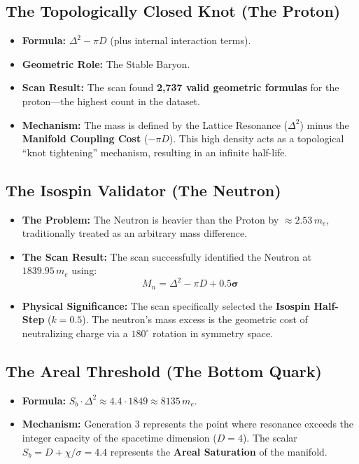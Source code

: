 \subsection*{The Topologically Closed Knot (The Proton)}
\begin{itemize}
    \item \textbf{Formula:} $\Delta^2 - \pi D$ (plus internal interaction terms).
    \item \textbf{Geometric Role:} The Stable Baryon.
    \item \textbf{Scan Result:} The scan found \textbf{2,737 valid geometric formulas} for the proton—the highest count in the dataset.
    \item \textbf{Mechanism:} The mass is defined by the Lattice Resonance ($\Delta^2$) minus the \textbf{Manifold Coupling Cost} ($-\pi D$). This high density acts as a topological ``knot tightening'' mechanism, resulting in an infinite half-life.
\end{itemize}

\subsection*{The Isospin Validator (The Neutron)}
\begin{itemize}
    \item \textbf{The Problem:} The Neutron is heavier than the Proton by $\approx 2.53 \, m_e$, traditionally treated as an arbitrary mass difference.
    \item \textbf{The Scan Result:} The scan successfully identified the Neutron at $1839.95 \, m_e$ using:
    \[ M_n = \Delta^2 - \pi D + \mathbf{0.5 \sigma} \]
    \item \textbf{Physical Significance:} The scan specifically selected the \textbf{Isospin Half-Step} ($k=0.5$). The neutron's mass excess is the geometric cost of neutralizing charge via a $180^\circ$ rotation in symmetry space.
\end{itemize}

\subsection*{The Areal Threshold (The Bottom Quark)}
\begin{itemize}
    \item \textbf{Formula:} $S_b \cdot \Delta^2 \approx 4.4 \cdot 1849 \approx 8135 \, m_e$.
    \item \textbf{Mechanism:} Generation 3 represents the point where resonance exceeds the integer capacity of the spacetime dimension ($D=4$). The scalar $S_b = D + \chi/\sigma = 4.4$ represents the \textbf{Areal Saturation} of the manifold.
\end{itemize}

